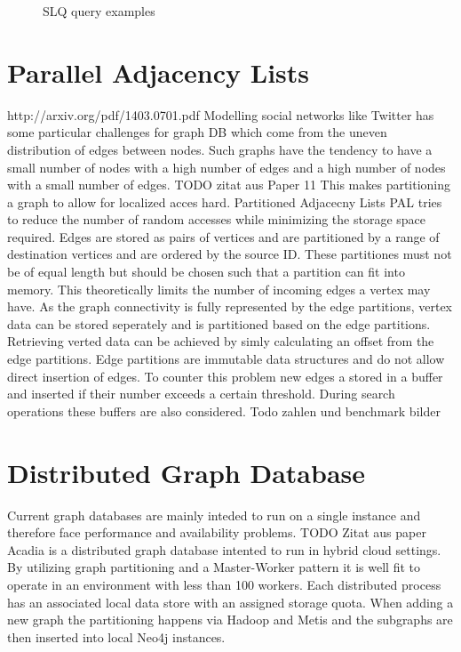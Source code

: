 \documentclass{sig-alternate}
\begin{document}
\begin{figure}
\centering
{}
\caption{SLQ query examples}
\label{fig:slqexample}
\end{figure}

\section{Parallel Adjacency Lists}
http://arxiv.org/pdf/1403.0701.pdf
Modelling social networks like Twitter has some particular challenges
for graph DB which come from the uneven distribution of edges between nodes.
Such graphs have the tendency to have a small number of nodes with a high number of edges
and a high number of nodes with a small number of edges. TODO zitat aus Paper 11
This makes partitioning a graph to allow for localized acces hard.
Partitioned Adjacecny Lists PAL tries to reduce the number of random accesses while minimizing the storage
space required. Edges are stored as pairs of vertices and are partitioned by a range of destination
vertices and are ordered by the source ID. These partitiones must not be of equal length but should 
be chosen such that a partition can fit into memory. This theoretically limits the number of
incoming edges a vertex may have.
As the graph connectivity is fully represented 
by the edge partitions, vertex data can be stored seperately and is partitioned 
based on the edge partitions. Retrieving verted data can be achieved by simly calculating an offset from
the edge partitions.
Edge partitions are immutable data structures and do not allow direct insertion of edges. 
To counter this problem new edges a stored in a buffer and inserted if their number exceeds a certain threshold.
During search operations these buffers are also considered.
Todo zahlen und benchmark bilder

\section{Distributed Graph Database}
Current graph databases are mainly inteded to run on a single instance and therefore
face performance and availability problems. TODO Zitat aus paper 
Acadia is a distributed graph database intented to run in hybrid cloud settings.
By utilizing graph partitioning and a Master-Worker pattern it is well fit to 
operate in an environment with less than 100 workers.
Each distributed process has an associated local data store with an assigned storage quota.
When adding a new graph the partitioning happens via Hadoop and Metis and the subgraphs are then inserted into local
Neo4j instances.
\end{document}

